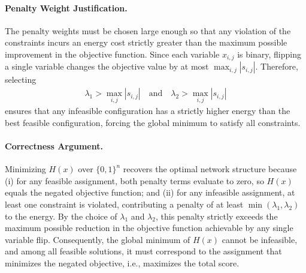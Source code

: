 \documentclass[12pt]{article}
\begin{document}
\paragraph{Penalty Weight Justification.}
The penalty weights must be chosen large enough so that any violation of the constraints incurs an energy cost strictly greater than the maximum possible improvement in the objective function. Since each variable $x_{i,j}$ is binary, flipping a single variable changes the objective value by at most $\max_{i,j} |s_{i,j}|$. Therefore, selecting
\begin{align}
    \lambda_1 > \max_{i,j} |s_{i,j}| \quad \text{and} \quad \lambda_2 > \max_{i,j} |s_{i,j}|
\end{align}
ensures that any infeasible configuration has a strictly higher energy than the best feasible configuration, forcing the global minimum to satisfy all constraints.

\paragraph{Correctness Argument.}
Minimizing $H(x)$ over $\{0,1\}^n$ recovers the optimal network structure because (i) for any feasible assignment, both penalty terms evaluate to zero, so $H(x)$ equals the negated objective function; and (ii) for any infeasible assignment, at least one constraint is violated, contributing a penalty of at least $\min(\lambda_1, \lambda_2)$ to the energy. By the choice of $\lambda_1$ and $\lambda_2$, this penalty strictly exceeds the maximum possible reduction in the objective function achievable by any single variable flip. Consequently, the global minimum of $H(x)$ cannot be infeasible, and among all feasible solutions, it must correspond to the assignment that minimizes the negated objective, i.e., maximizes the total score.
\end{document}

